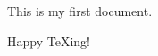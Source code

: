 \documentclass{article}
\begin{document}
This is my first document.



Happy \TeX ing!
\end{document}
